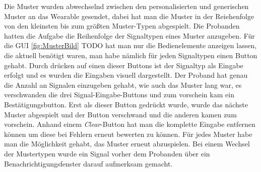 
Die Muster wurden abwechselnd zwischen den personalisierten und generischen Muster an das Wearable gesendet, dabei hat man die Muster in der Reiehenfolge von den kleinsten bis zum gr{\"o}{\ss}ten Muster-Typen abgespielt. 
Die Probanden hatten die Aufgabe die Reihenfolge der Signaltypen eines Muster anzugeben.
F{\"u}r die GUI \autoref{fig:MusterBild} TODO hat man nur die Bedienelemente anzeigen lassen, die aktuell ben{\"o}tigt waren, man habe n{\"a}mlich f{\"u}r jeden Signaltypen einen Button gehabt. Durch dr{\"u}cken auf einen dieser Buttons ist der Signaltyp als Eingabe erfolgt und es wurden die Eingaben visuell dargestellt.
Der Proband hat genau die Anzahl an Signalen einzugeben gehabt, wie auch das Muster lang war, es verschwanden die drei Signal-Eingabe-Buttons und zum vorschein kam ein Best{\"a}tigungsbutton. Erst als dieser Button gedr{\"u}ckt wurde, wurde das n{\"a}chste Muster abgespielt und der Button verschwand und die anderen kamen zum vorschein. 
Anhand einem \textit{Clear}-Button hat man die komplette Eingabe entfernen k{\"o}nnen um diese bei Fehlern erneut bewerten zu k{\"o}nnen.
F{\"u}r jedes Muster habe man die M{\"o}glichkeit gehabt, das Muster erneut abzuspielen.  
Bei einem Wechsel der Mustertypen wurde ein Signal vorher dem Probanden {\"u}ber ein Benachrichtigungsfenster darauf aufmerksam gemacht.

